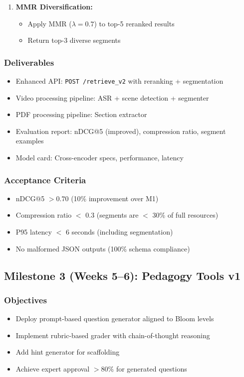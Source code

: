 \documentclass[11pt,letterpaper]{article}
\begin{document}
\begin{enumerate}
\item \textbf{MMR Diversification:}
\begin{itemize}
\item Apply MMR ($\lambda = 0.7$) to top-5 reranked results
\item Return top-3 diverse segments
\end{itemize}
\end{enumerate}

\subsubsection{Deliverables}
\begin{itemize}
\item Enhanced API: \texttt{POST /retrieve\_v2} with reranking + segmentation
\item Video processing pipeline: ASR + scene detection + segmenter
\item PDF processing pipeline: Section extractor
\item Evaluation report: nDCG@5 (improved), compression ratio, segment examples
\item Model card: Cross-encoder specs, performance, latency
\end{itemize}

\subsubsection{Acceptance Criteria}
\begin{itemize}
\item nDCG@5 $> 0.70$ (10\% improvement over M1)
\item Compression ratio $<$ 0.3 (segments are $<$ 30\% of full resources)
\item P95 latency $<$ 6 seconds (including segmentation)
\item No malformed JSON outputs (100\% schema compliance)
\end{itemize}

\subsection{Milestone 3 (Weeks 5--6): Pedagogy Tools v1}

\subsubsection{Objectives}
\begin{itemize}
\item Deploy prompt-based question generator aligned to Bloom levels
\item Implement rubric-based grader with chain-of-thought reasoning
\item Add hint generator for scaffolding
\item Achieve expert approval $> 80\%$ for generated questions
\end{itemize}
\end{document}
